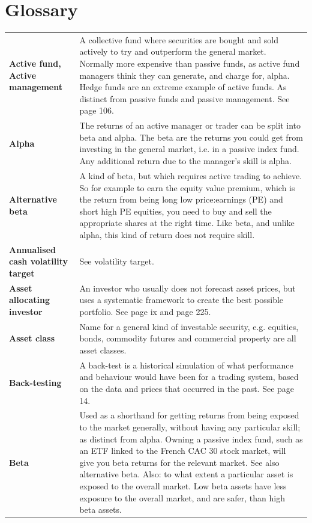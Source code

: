\chapter*{Glossary}  {} 

{\small
\setlength{\LTpre}{0pt} \setlength{\LTpost}{0pt} \setlength{\tabcolsep}{4pt} \renewcommand{\arraystretch}{1.1} \begin{longtable}{@{}>{\raggedright\arraybackslash\bfseries} p{}>{\raggedright\arraybackslash} p{}@{}} Active fund, Active management & A collective fund where securities are bought and sold actively to try and outperform the general market. Normally more expensive than passive funds, as active fund managers think they can generate, and charge for, alpha. Hedge funds are an extreme example of active funds. As distinct from passive funds and passive management. See page 106. \\[0.65em]
Alpha & The returns of an active manager or trader can be split into beta and alpha. The beta are the returns you could get from investing in the general market, i.e. in a passive index fund. Any additional return due to the manager’s skill is alpha. \\[0.65em]
Alternative beta & A kind of beta, but which requires active trading to achieve. So for example to earn the equity value premium, which is the return from being long low price:earnings (PE) and short high PE equities, you need to buy and sell the appropriate shares at the right time. Like beta, and unlike alpha, this kind of return does not require skill. \\[0.65em]
Annualised cash volatility target & See volatility target. \\[0.65em]
Asset allocating investor & An investor who usually does not forecast asset prices, but uses a systematic framework to create the best possible portfolio. See page ix and page 225. \\[0.65em]
Asset class & Name for a general kind of investable security, e.g. equities, bonds, commodity futures and commercial property are all asset classes. \\[0.65em]
Back-testing & A back-test is a historical simulation of what performance and behaviour would have been for a trading system, based on the data and prices that occurred in the past. See page 14. \\[0.65em]
Beta & Used as a shorthand for getting returns from being exposed to the market generally, without having any particular skill; as distinct from alpha. Owning a passive index fund, such as an ETF linked to the French CAC 30 stock market, will give you beta returns for the relevant market. See also alternative beta. Also: to what extent a particular asset is exposed to the overall market. Low beta assets have less exposure to the overall market, and are safer, than high beta assets. \\[0.65em]

\end{longtable}}
